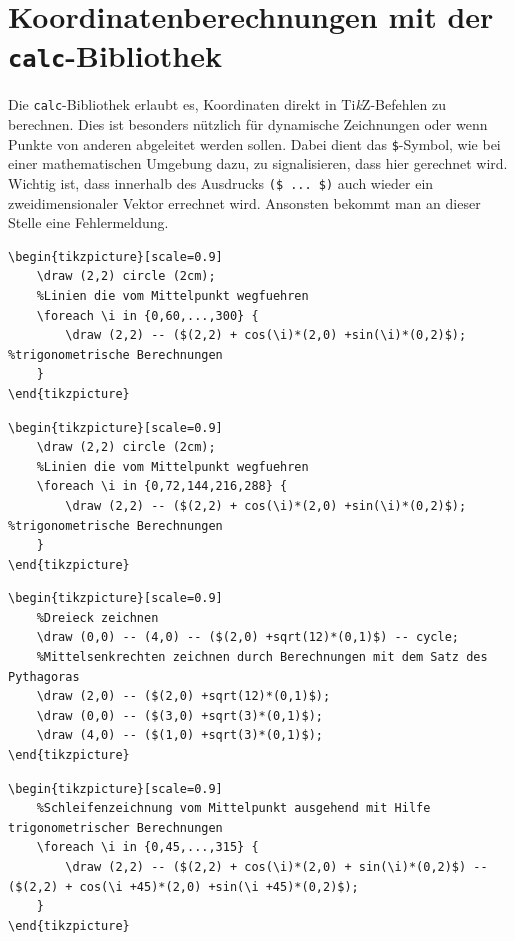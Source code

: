 \section{Koordinatenberechnungen mit der \texttt{calc}-Bibliothek}

Die \texttt{calc}-Bibliothek erlaubt es, Koordinaten direkt in Ti\textit{k}Z-Befehlen zu berechnen. Dies ist besonders nützlich für dynamische Zeichnungen oder wenn Punkte von anderen abgeleitet werden sollen. Dabei dient das \texttt{\$}-Symbol, wie bei einer mathematischen Umgebung dazu,  zu signalisieren, dass hier gerechnet wird. Wichtig ist, dass innerhalb des Ausdrucks \texttt{(\$ ... \$)} auch wieder ein zweidimensionaler Vektor errechnet wird. Ansonsten bekommt man an dieser Stelle eine Fehlermeldung.

\begin{lstlisting}[style=latex]
%Kreis mit 6 Segmenten
\begin{tikzpicture}[scale=0.9]
	\draw (2,2) circle (2cm);
	%Linien die vom Mittelpunkt wegfuehren
	\foreach \i in {0,60,...,300} {
		\draw (2,2) -- ($(2,2) + cos(\i)*(2,0) +sin(\i)*(0,2)$);		%trigonometrische Berechnungen
	}
\end{tikzpicture}
\end{lstlisting}

\begin{lstlisting}[style=latex]
%Kreis mit 5 Segmenten
\begin{tikzpicture}[scale=0.9]
	\draw (2,2) circle (2cm);
	%Linien die vom Mittelpunkt wegfuehren
	\foreach \i in {0,72,144,216,288} {
		\draw (2,2) -- ($(2,2) + cos(\i)*(2,0) +sin(\i)*(0,2)$);		%trigonometrische Berechnungen
	}
\end{tikzpicture}
\end{lstlisting}

\begin{lstlisting}[style=latex]
%Gleichseitiges Dreieck mit 6 Segmenten
\begin{tikzpicture}[scale=0.9]
	%Dreieck zeichnen
	\draw (0,0) -- (4,0) -- ($(2,0) +sqrt(12)*(0,1)$) -- cycle;
	%Mittelsenkrechten zeichnen durch Berechnungen mit dem Satz des Pythagoras
	\draw (2,0) -- ($(2,0) +sqrt(12)*(0,1)$);
	\draw (0,0) -- ($(3,0) +sqrt(3)*(0,1)$);
	\draw (4,0) -- ($(1,0) +sqrt(3)*(0,1)$);
\end{tikzpicture}
\end{lstlisting}

\begin{lstlisting}[style=latex]
%Regelmaessiges Acht-Eck
\begin{tikzpicture}[scale=0.9]
	%Schleifenzeichnung vom Mittelpunkt ausgehend mit Hilfe trigonometrischer Berechnungen
	\foreach \i in {0,45,...,315} {
		\draw (2,2) -- ($(2,2) + cos(\i)*(2,0) + sin(\i)*(0,2)$) -- ($(2,2) + cos(\i +45)*(2,0) +sin(\i +45)*(0,2)$);
	}
\end{tikzpicture}
\end{lstlisting}

